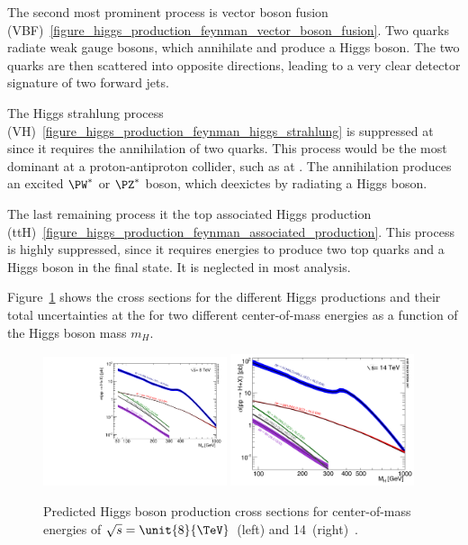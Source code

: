 The second most prominent process is vector boson fusion (VBF)~\ref{figure_higgs_production_feynman_vector_boson_fusion}.
Two quarks radiate weak gauge bosons, which annihilate and produce a Higgs boson. The two quarks are then scattered into opposite
directions, leading to a very clear detector signature of two forward jets.

The Higgs strahlung process (VH)~\ref{figure_higgs_production_feynman_higgs_strahlung} is suppressed at \LHC since it requires the
annihilation of two quarks. This process would be the most dominant at a proton-antiproton collider, such as \Tevatron at \Fermilab.
The annihilation produces an excited $\PW^*$ or $\PZ^*$ boson, which deexictes by radiating a Higgs boson.

The last remaining process it the top associated Higgs production (ttH)~\ref{figure_higgs_production_feynman_associated_production}.
This process is highly suppressed, since it requires energies to produce two top quarks and a Higgs boson in the final state. It is
neglected in most analysis.

Figure~\ref{figure_higgs_production_cross_sections} shows the cross sections for the different Higgs productions and their total uncertainties
at the \LHC for two different center-of-mass energies as a function of the Higgs boson mass $m_H$.


\begin{figure}[h]
\includegraphics[width=0.48\textwidth]{figures/Higgs_XS_8TeV_lx.pdf}
\hfill
\includegraphics[width=0.48\textwidth]{figures/YRHXS_Summary_fig3}
\caption[Higgs boson production cross sections.]{Predicted Higgs boson production cross sections for center-of-mass energies of $\sqrt s=\unit{8}{\TeV}$~(left) and \unit{14}{\TeV}~(right)~\cite{yellow_report_1, yellow_report_2, yellow_report_3}.}
\label{figure_higgs_production_cross_sections}
\end{figure}
